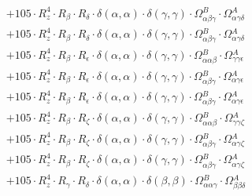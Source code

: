 \documentclass{article}
\begin{document}
\begin{subequations}
\begin{gather}
\begin{array}{c}
 \\[0.2em] 		 + 105 \cdot R_{z}^{4} \cdot R_{\beta{}} \cdot R_{\delta{}} \cdot \delta{}\left(\alpha{}, \alpha{}\right) \cdot \delta{}\left(\gamma{}, \gamma{}\right) \cdot \Omega{}^{B}_{\alpha{}\beta{}\gamma{}} \cdot \Omega{}^{A}_{\alpha{}\gamma{}\delta{}} 
 \\[0.2em] 		 + 105 \cdot R_{z}^{4} \cdot R_{\beta{}} \cdot R_{\delta{}} \cdot \delta{}\left(\alpha{}, \alpha{}\right) \cdot \delta{}\left(\gamma{}, \gamma{}\right) \cdot \Omega{}^{B}_{\alpha{}\beta{}\gamma{}} \cdot \Omega{}^{A}_{\alpha{}\gamma{}\delta{}} 
 \\[0.2em] 		 + 105 \cdot R_{z}^{4} \cdot R_{\beta{}} \cdot R_{\epsilon{}} \cdot \delta{}\left(\alpha{}, \alpha{}\right) \cdot \delta{}\left(\gamma{}, \gamma{}\right) \cdot \Omega{}^{B}_{\alpha{}\alpha{}\beta{}} \cdot \Omega{}^{A}_{\gamma{}\gamma{}\epsilon{}} 
 \\[0.2em] 		 + 105 \cdot R_{z}^{4} \cdot R_{\beta{}} \cdot R_{\epsilon{}} \cdot \delta{}\left(\alpha{}, \alpha{}\right) \cdot \delta{}\left(\gamma{}, \gamma{}\right) \cdot \Omega{}^{B}_{\alpha{}\beta{}\gamma{}} \cdot \Omega{}^{A}_{\alpha{}\gamma{}\epsilon{}} 
 \\[0.2em] 		 + 105 \cdot R_{z}^{4} \cdot R_{\beta{}} \cdot R_{\epsilon{}} \cdot \delta{}\left(\alpha{}, \alpha{}\right) \cdot \delta{}\left(\gamma{}, \gamma{}\right) \cdot \Omega{}^{B}_{\alpha{}\beta{}\gamma{}} \cdot \Omega{}^{A}_{\alpha{}\gamma{}\epsilon{}} 
 \\[0.2em] 		 + 105 \cdot R_{z}^{4} \cdot R_{\beta{}} \cdot R_{\zeta{}} \cdot \delta{}\left(\alpha{}, \alpha{}\right) \cdot \delta{}\left(\gamma{}, \gamma{}\right) \cdot \Omega{}^{B}_{\alpha{}\alpha{}\beta{}} \cdot \Omega{}^{A}_{\gamma{}\gamma{}\zeta{}} 
 \\[0.2em] 		 + 105 \cdot R_{z}^{4} \cdot R_{\beta{}} \cdot R_{\zeta{}} \cdot \delta{}\left(\alpha{}, \alpha{}\right) \cdot \delta{}\left(\gamma{}, \gamma{}\right) \cdot \Omega{}^{B}_{\alpha{}\beta{}\gamma{}} \cdot \Omega{}^{A}_{\alpha{}\gamma{}\zeta{}} 
 \\[0.2em] 		 + 105 \cdot R_{z}^{4} \cdot R_{\beta{}} \cdot R_{\zeta{}} \cdot \delta{}\left(\alpha{}, \alpha{}\right) \cdot \delta{}\left(\gamma{}, \gamma{}\right) \cdot \Omega{}^{B}_{\alpha{}\beta{}\gamma{}} \cdot \Omega{}^{A}_{\alpha{}\gamma{}\zeta{}} 
 \\[0.2em] 		 + 105 \cdot R_{z}^{4} \cdot R_{\gamma{}} \cdot R_{\delta{}} \cdot \delta{}\left(\alpha{}, \alpha{}\right) \cdot \delta{}\left(\beta{}, \beta{}\right) \cdot \Omega{}^{B}_{\alpha{}\alpha{}\gamma{}} \cdot \Omega{}^{A}_{\beta{}\beta{}\delta{}} 

\end{array}
\end{gather}
\end{subequations}
\end{document}
